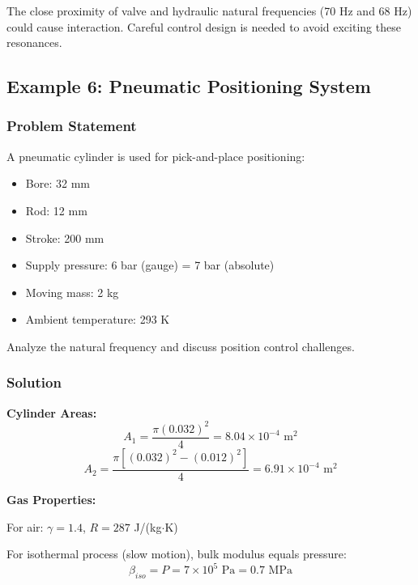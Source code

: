 The close proximity of valve and hydraulic natural frequencies (70 Hz and 68 Hz) could cause interaction. Careful control design is needed to avoid exciting these resonances.

\subsection{Example 6: Pneumatic Positioning System}

\subsubsection{Problem Statement}

A pneumatic cylinder is used for pick-and-place positioning:

\begin{itemize}
    \item Bore: 32 mm
    \item Rod: 12 mm
    \item Stroke: 200 mm
    \item Supply pressure: 6 bar (gauge) = 7 bar (absolute)
    \item Moving mass: 2 kg
    \item Ambient temperature: 293 K
\end{itemize}

Analyze the natural frequency and discuss position control challenges.

\subsubsection{Solution}

\textbf{Cylinder Areas:}
\begin{equation}
    A_1 = \frac{\pi (0.032)^2}{4} = 8.04 \times 10^{-4} \text{ m}^2
\end{equation}
\begin{equation}
    A_2 = \frac{\pi [(0.032)^2 - (0.012)^2]}{4} = 6.91 \times 10^{-4} \text{ m}^2
\end{equation}

\textbf{Gas Properties:}

For air: $\gamma = 1.4$, $R = 287$ J/(kg$\cdot$K)

For isothermal process (slow motion), bulk modulus equals pressure:
\begin{equation}
    \beta_{iso} = P = 7 \times 10^5 \text{ Pa} = 0.7 \text{ MPa}
\end{equation}

